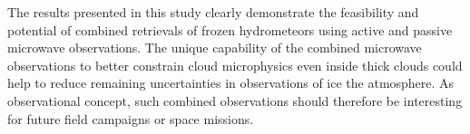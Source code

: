 \documentclass[journal abbreviation, manuscript]{copernicus}
\begin{document}
The results presented in this study clearly demonstrate the feasibility and
potential of combined retrievals of frozen hydrometeors using active and passive
microwave observations. The unique capability of the combined microwave
observations to better constrain cloud microphysics even inside thick clouds
could help to reduce remaining uncertainties in observations of ice the
atmosphere. As observational concept, such combined observations should
therefore be interesting for future field campaigns or space missions.





\dataavailability{} %



\appendix
\section{}    %

\subsection{}     %


\noappendix       %



\end{document}
